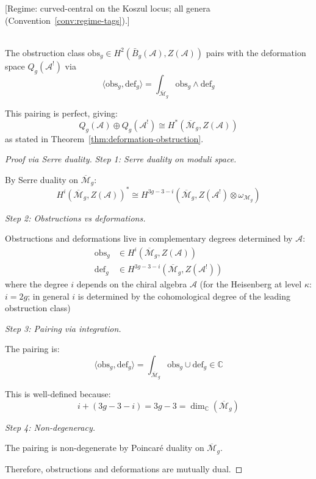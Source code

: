 \begin{theorem}\label{thm:obs-def-pairing-explicit}
\textup{[Regime: curved-central on the Koszul locus; all genera
\textup{(}Convention~\textup{\ref{conv:regime-tags})}.]}

\leavevmode\\
The obstruction class
$\text{obs}_g \in H^2(\bar{B}_g(\mathcal{A}), Z(\mathcal{A}))$
pairs with the deformation space $Q_g(\mathcal{A}^!)$ via
\begin{equation}
\langle \text{obs}_g, \text{def}_g \rangle = \int_{\overline{\mathcal{M}}_g} 
\text{obs}_g \wedge \text{def}_g
\end{equation}

This pairing is perfect, giving:
\[Q_g(\mathcal{A}) \oplus Q_g(\mathcal{A}^!) \cong H^*(\overline{\mathcal{M}}_g, 
Z(\mathcal{A}))\]
as stated in Theorem~\ref{thm:deformation-obstruction}.
\end{theorem}

\begin{proof}[Proof via Serre duality]

\emph{Step 1: Serre duality on moduli space.}

By Serre duality on $\overline{\mathcal{M}}_g$:
\[H^i(\overline{\mathcal{M}}_g, Z(\mathcal{A}))^* \cong 
H^{3g-3-i}(\overline{\mathcal{M}}_g, Z(\mathcal{A}^!) \otimes \omega_{\mathcal{M}_g})\]

\emph{Step 2: Obstructions vs deformations.}

Obstructions and deformations live in complementary degrees determined
by $\mathcal{A}$:
\begin{align}
\text{obs}_g &\in H^i(\overline{\mathcal{M}}_g, Z(\mathcal{A})) \\
\text{def}_g &\in H^{3g-3-i}(\overline{\mathcal{M}}_g, Z(\mathcal{A}^!))
\end{align}
where the degree $i$ depends on the chiral algebra $\mathcal{A}$
(for the Heisenberg at level $\kappa$: $i = 2g$;
in general $i$ is determined by the cohomological degree of
the leading obstruction class)

\emph{Step 3: Pairing via integration.}

The pairing is:
\[\langle \text{obs}_g, \text{def}_g \rangle = \int_{\overline{\mathcal{M}}_g} 
\text{obs}_g \cup \text{def}_g \in \mathbb{C}\]

This is well-defined because:
\[i + (3g-3-i) = 3g-3 = \dim_{\mathbb{C}}(\overline{\mathcal{M}}_g)\]

\emph{Step 4: Non-degeneracy.}

The pairing is non-degenerate by Poincaré duality on $\overline{\mathcal{M}}_g$.

Therefore, obstructions and deformations are mutually dual.
\end{proof}

